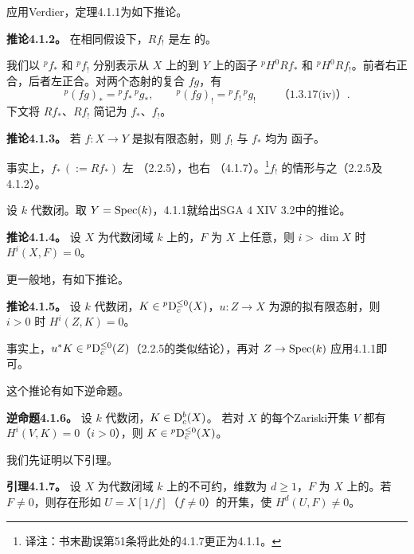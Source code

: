 应用Verdier，定理4.1.1为如下推论。

\par\medskip\noindent\textbf{推论4.1.2。} 在相同假设下，$Rf_!$ 是左 的。

我们以 ${}^pf_*$ 和 ${}^pf_!$ 分别表示从 $X$ 上的到 $Y$ 上的函子 ${}^pH^0Rf_*$ 和 ${}^pH^0Rf_!$。前者右正合，后者左正合。对两个态射的复合 $fg$，有
\[{}^p(fg)_*={}^pf_*\,{}^pg_*,\qquad{}^p(fg)_!={}^pf_!\,{}^pg_!\qquad\text{（1.3.17(iv)）}.\]
下文将 $Rf_*$、$Rf_!$ 简记为 $f_*$、$f_!$。

\par\medskip\noindent\textbf{推论4.1.3。} 若 $f:X\to Y$ 是拟有限态射，则 $f_!$ 与 $f_*$ 均为 函子。

事实上，$f_*\,(:=Rf_*)$ 左 （2.2.5），也右 （4.1.7）。\footnote{译注：书末勘误第51条将此处的4.1.7更正为4.1.1。}$f_!$ 的情形与之（2.2.5及4.1.2）。

设 $k$ 代数闭。取 $Y=\operatorname{Spec}(k)$，4.1.1就给出SGA 4 XIV 3.2中的推论。

\par\medskip\noindent\textbf{推论4.1.4。} 设 $X$ 为代数闭域 $k$ 上的，$F$ 为 $X$ 上任意，则 $i>\dim X$ 时 $H^i(X,F)=0$。

更一般地，有如下推论。

\par\medskip\noindent\textbf{推论4.1.5。} 设 $k$ 代数闭，$K\in{}^p\mathrm{D}_c^{\le0}(X)$，$u:Z\to X$ 为源的拟有限态射，则 $i>0$ 时 $H^i(Z,K)=0$。

事实上，$u^*K\in{}^p\mathrm{D}_c^{\le0}(Z)$（2.2.5的类似结论），再对 $Z\to\operatorname{Spec}(k)$ 应用4.1.1即可。

这个推论有如下逆命题。

\par\medskip\noindent\textbf{逆命题4.1.6。} 设 $k$ 代数闭，$K\in\mathrm{D}_c^b(X)$。
若对 $X$ 的每个Zariski开集 $V$ 都有 $H^i(V,K)=0$（$i>0$），则 $K\in{}^p\mathrm{D}_c^{\le0}(X)$。

我们先证明以下引理。

\par\medskip\noindent\textbf{引理4.1.7。} 设 $X$ 为代数闭域 $k$ 上的不可约，维数为 $d\ge1$，$F$ 为 $X$ 上的。若 $F\ne0$，则存在形如 $U=X[1/f]$（$f\ne0$）的开集，使 $H^d(U,F)\ne0$。

